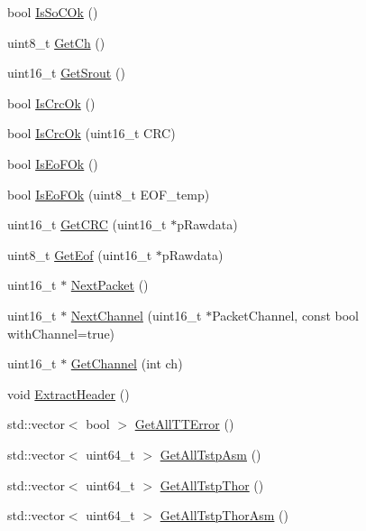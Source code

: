 \begin{DoxyCompactItemize}
bool \hyperlink{classDecodeFrame_aa778340ea2650ce866f2aac9a59368d4}{Is\+So\+C\+Ok} ()
\item 
uint8\+\_\+t \hyperlink{classDecodeFrame_a9a29ecf0f789fb4afaf0d6fc1fbe9cc2}{Get\+Ch} ()
\item 
uint16\+\_\+t \hyperlink{classDecodeFrame_a7418f106eb0998d886ce5849cfb031d9}{Get\+Srout} ()
\item 
bool \hyperlink{classDecodeFrame_a239ca7a7a2ffe98f2221137a6119139d}{Is\+Crc\+Ok} ()
\item 
bool \hyperlink{classDecodeFrame_a2e091adf918a4407f9a476f81a32f27a}{Is\+Crc\+Ok} (uint16\+\_\+t C\+RC)
\item 
bool \hyperlink{classDecodeFrame_aff3430f81b2b782784b06bfca9616d9f}{Is\+Eo\+F\+Ok} ()
\item 
bool \hyperlink{classDecodeFrame_abca00274eaee9867f0f98065e9bc0561}{Is\+Eo\+F\+Ok} (uint8\+\_\+t E\+O\+F\+\_\+temp)
\item 
uint16\+\_\+t \hyperlink{classDecodeFrame_acb0f0ed7feeaeddc24e4b95237202517}{Get\+C\+RC} (uint16\+\_\+t $\ast$p\+Rawdata)
\item 
uint8\+\_\+t \hyperlink{classDecodeFrame_a85867f5f906e63c94c8f4032c1fb973a}{Get\+Eof} (uint16\+\_\+t $\ast$p\+Rawdata)
\item 
uint16\+\_\+t $\ast$ \hyperlink{classDecodeFrame_a626bb469119a8a2732a57f1a683750c0}{Next\+Packet} ()
\item 
uint16\+\_\+t $\ast$ \hyperlink{classDecodeFrame_a7b107fcd9fdc586f4ba9eee981a95e4f}{Next\+Channel} (uint16\+\_\+t $\ast$Packet\+Channel, const bool with\+Channel=true)
\item 
uint16\+\_\+t $\ast$ \hyperlink{classDecodeFrame_ad2fe83b67344c853dc9434a56007ad20}{Get\+Channel} (int ch)
\item 
void \hyperlink{classDecodeFrame_a7d3cb26d923ec22430687186a002c1a8}{Extract\+Header} ()
\item 
std\+::vector$<$ bool $>$ \hyperlink{classDecodeFrame_af5305c10c1bf439b864428f2f19e546c}{Get\+All\+T\+T\+Error} ()
\item 
std\+::vector$<$ uint64\+\_\+t $>$ \hyperlink{classDecodeFrame_a0b3030ee5fcf599dfc15efa03b007a2d}{Get\+All\+Tstp\+Asm} ()
\item 
std\+::vector$<$ uint64\+\_\+t $>$ \hyperlink{classDecodeFrame_aaf768149c11e4f8393af44b73c0163c9}{Get\+All\+Tstp\+Thor} ()
\item 
std\+::vector$<$ uint64\+\_\+t $>$ \hyperlink{classDecodeFrame_a93dc46d04d8ccfbb75284dfaf72b5b25}{Get\+All\+Tstp\+Thor\+Asm} ()

\end{DoxyCompactItemize}
